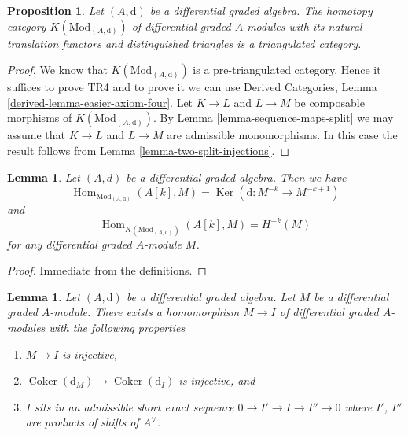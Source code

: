\documentclass{stacks-project}
\theoremstyle{plain}
\newtheorem{proposition}[subsection]{Proposition}
\newtheorem{lemma}[subsection]{Lemma}
\theoremstyle{definition}
\theoremstyle{remark}
\numberwithin{equation}{subsection}
\def\Hom{\mathop{\mathrm{Hom}}\nolimits}
\def\Ker{\mathop{\mathrm{Ker}}}
\def\Coker{\mathop{\mathrm{Coker}}}
\begin{document}
\begin{proposition}
\label{proposition-homotopy-category-triangulated}
Let $(A, \text{d})$ be a differential graded algebra. The homotopy category
$K(\text{Mod}_{(A, \text{d})})$ of differential graded $A$-modules with its
natural translation functors and distinguished triangles is a triangulated
category.
\end{proposition}

\begin{proof}
We know that $K(\text{Mod}_{(A, \text{d})})$ is a pre-triangulated category.
Hence it suffices to prove TR4 and to prove it we can use
Derived Categories, Lemma \ref{derived-lemma-easier-axiom-four}.
Let $K \to L$ and $L \to M$ be composable morphisms of
$K(\text{Mod}_{(A, \text{d})})$. By
Lemma \ref{lemma-sequence-maps-split} we may assume that
$K \to L$ and $L \to M$ are admissible monomorphisms.
In this case the result follows from
Lemma \ref{lemma-two-split-injections}.
\end{proof}

\begin{lemma}
\label{lemma-hom-from-shift-free}
Let $(A, d)$ be a differential graded algebra. Then we have
$$
\Hom_{\text{Mod}_{(A, \text{d})}}(A[k], M) =
\Ker(\text{d} : M^{-k} \to M^{-k + 1})
$$
and
$$
\Hom_{K(\text{Mod}_{(A, \text{d})})}(A[k], M) = H^{-k}(M)
$$
for any differential graded $A$-module $M$.
\end{lemma}

\begin{proof}
Immediate from the definitions.
\end{proof}

\begin{lemma}
\label{lemma-good-sub}
Let $(A, \text{d})$ be a differential graded algebra.
Let $M$ be a differential graded $A$-module. There exists a homomorphism
$M \to I$ of differential graded $A$-modules with the following
properties
\begin{enumerate}
\item $M \to I$ is injective,
\item $\Coker(\text{d}_M) \to \Coker(\text{d}_I)$ is injective,
and
\item $I$ sits in an admissible short exact sequence
$0 \to I' \to I \to I'' \to 0$ where $I'$, $I''$ are products
of shifts of $A^\vee$.
\end{enumerate}
\end{lemma}
\end{document}
